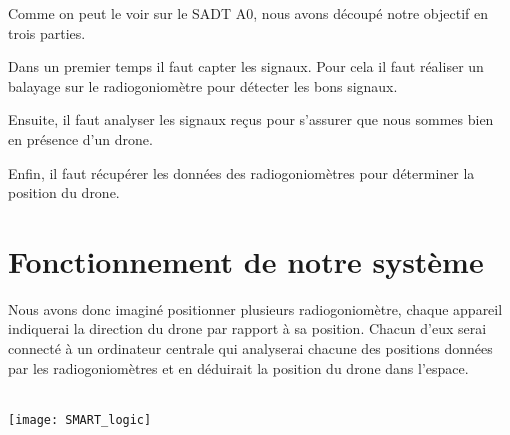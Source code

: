 \newpage
\parindent=15pt

Comme on peut le voir sur le SADT A0, nous avons découpé notre objectif en trois parties.

Dans un premier temps il faut capter les signaux. Pour cela il faut réaliser un balayage sur le radiogoniomètre pour détecter les bons signaux.

Ensuite, il faut analyser les signaux reçus pour s'assurer que nous sommes bien en présence d'un drone.

Enfin, il faut récupérer les données des radiogoniomètres pour déterminer la position du drone.


\section{Fonctionnement de notre système}

Nous avons donc imaginé positionner plusieurs radiogoniomètre, chaque appareil indiquerai la direction du drone par rapport à sa position. Chacun d'eux serai connecté à un ordinateur centrale qui analyserai chacune des positions données par les radiogoniomètres et en déduirait la position du drone dans l'espace.

~\\

\texttt{[image: SMART\_logic]}




